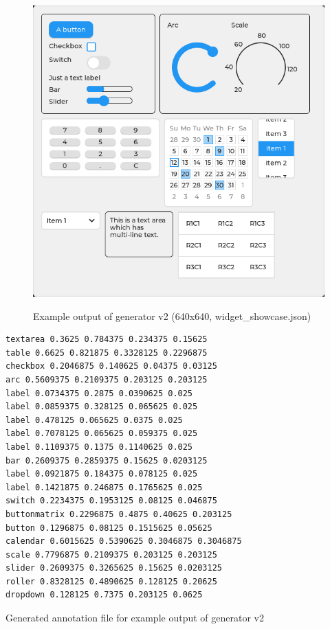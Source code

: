 \documentclass[Bachelor, BIC, english, fhCitStyle, IEEE]{BASE/twbook} %
\begin{document}
\begin{figure}
    \caption{Example output of generator v2 (640x640, widget\_showcase.json)}
    \centering
    \includegraphics[height=0.4\textheight]{generator_v2_example.jpg}
    \label{fig:genv2example}
\end{figure}
\begin{listing}[htbp]
    \begin{verbatim}
textarea 0.3625 0.784375 0.234375 0.15625
table 0.6625 0.821875 0.3328125 0.2296875
checkbox 0.2046875 0.140625 0.04375 0.03125
arc 0.5609375 0.2109375 0.203125 0.203125
label 0.0734375 0.2875 0.0390625 0.025
label 0.0859375 0.328125 0.065625 0.025
label 0.478125 0.065625 0.0375 0.025
label 0.7078125 0.065625 0.059375 0.025
label 0.1109375 0.1375 0.1140625 0.025
bar 0.2609375 0.2859375 0.15625 0.0203125
label 0.0921875 0.184375 0.078125 0.025
label 0.1421875 0.246875 0.1765625 0.025
switch 0.2234375 0.1953125 0.08125 0.046875
buttonmatrix 0.2296875 0.4875 0.40625 0.203125
button 0.1296875 0.08125 0.1515625 0.05625
calendar 0.6015625 0.5390625 0.3046875 0.3046875
scale 0.7796875 0.2109375 0.203125 0.203125
slider 0.2609375 0.3265625 0.15625 0.0203125
roller 0.8328125 0.4890625 0.128125 0.20625
dropdown 0.128125 0.7375 0.203125 0.0625
    \end{verbatim}
    \caption{Generated annotation file for example output of generator v2}
\end{listing}
\end{document}
